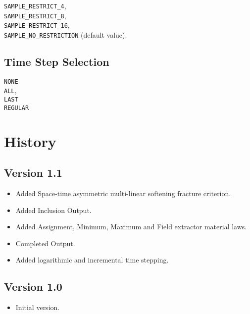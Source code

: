 \documentclass[10pt]{article}
\begin{document}
		\verb+SAMPLE_RESTRICT_4+,\\
		\verb+SAMPLE_RESTRICT_8+,\\
		\verb+SAMPLE_RESTRICT_16+,\\
		\verb+SAMPLE_NO_RESTRICTION+ (default value).



\subsection{Time Step Selection}
	\verb+NONE+\\
	\verb+ALL+,\\
	\verb+LAST+\\
	\verb+REGULAR+


\section{History}

\subsection*{Version 1.1}
\begin{itemize}
	\item Added Space-time asymmetric multi-linear softening fracture criterion.
	\item Added Inclusion Output.
	\item Added Assignment, Minimum, Maximum and Field extractor material laws.
	\item Completed Output.
	\item Added logarithmic and incremental time stepping.
\end{itemize}

\subsection*{Version 1.0}
\begin{itemize}
	\item Initial version.
\end{itemize}
	
\end{document}
